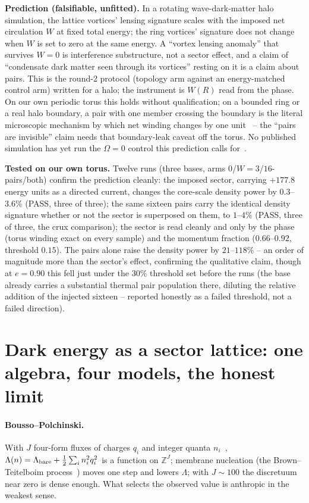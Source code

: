 \documentclass[11pt,a4paper]{article}
\begin{document}
\begin{keybox}
\textbf{Prediction (falsifiable, unfitted).} In a rotating wave-dark-matter halo simulation, the lattice
vortices' lensing signature scales with the imposed net circulation $W$ at fixed total energy; the ring
vortices' signature does not change when $W$ is set to zero at the same energy. A ``vortex lensing anomaly'' that
survives $W=0$ is interference substructure, not a sector effect, and a claim of ``condensate dark matter seen
through its vortices'' resting on it is a claim about pairs. This is the round-2 protocol (topology arm against
an energy-matched control arm) written for a halo; the instrument is $W(R)$ read from the phase. On our own
periodic torus this holds without qualification; on a bounded ring or a real halo boundary, a pair with one
member crossing the boundary is the literal microscopic mechanism by which net winding changes by one
unit~\cite{EckelEtAl2014} -- the ``pairs are invisible'' claim needs that boundary-leak caveat off the torus.
No published simulation has yet run the $\Omega=0$ control this prediction calls for~\cite{BraxValageas2025}.

\textbf{Tested on our own torus.} Twelve runs (three bases, arms $0$/$W{=}3$/$16$-pairs/both) confirm the
prediction cleanly: the imposed sector, carrying $+177.8$ energy units as a directed current, changes the
core-scale density power by $0.3$--$3.6\%$ (PASS, three of three); the same sixteen pairs carry the identical
density signature whether or not the sector is superposed on them, to $1$--$4\%$ (PASS, three of three, the
crux comparison); the sector is read cleanly and only by the phase (torus winding exact on every sample) and the
momentum fraction ($0.66$--$0.92$, threshold $0.15$). The pairs alone raise the density power by $21$--$118\%$ --
an order of magnitude more than the sector's effect, confirming the qualitative claim, though at $e=0.90$ this
fell just under the $30\%$ threshold set before the runs (the base already carries a substantial thermal pair
population there, diluting the relative addition of the injected sixteen -- reported honestly as a failed
threshold, not a failed direction).
\end{keybox}

\section{Dark energy as a sector lattice: one algebra, four models, the honest limit}

\paragraph{Bousso--Polchinski.} With $J$ four-form fluxes of charges $q_i$ and integer quanta
$n_i$~\cite{BoussoPolchinski2000}, $\Lambda(n)=\Lambda_{\rm bare}+\tfrac12\sum_i n_i^2q_i^2$ is a function on
$\mathbb Z^J$; membrane nucleation (the Brown--Teitelboim process~\cite{BrownTeitelboim1987}) moves one step and
lowers $\Lambda$; with $J\sim100$ the discretuum near zero is dense enough. What selects the observed value is
anthropic in the weakest sense.
\end{document}
